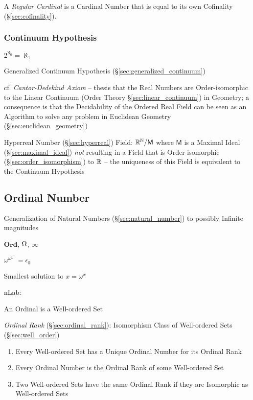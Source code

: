 A \emph{Regular Cardinal} is a Cardinal Number that is equal to its
own Cofinality (\S\ref{sec:cofinality}).



\subsubsection{Continuum Hypothesis}\label{sec:continuum_hypothesis}

$2^{\aleph_0} = \aleph_1$

Generalized Continuum Hypothesis (\S\ref{sec:generalized_continuum})

cf. \emph{Cantor-Dedekind Axiom} -- thesis that the Real Numbers are
Order-isomorphic to the Linear Continuum (Order Theory
\S\ref{sec:linear_continuum}) in Geometry; a consequence is that the
Decidability of the Ordered Real Field can be seen as an Algorithm to solve any
problem in Euclidean Geometry (\S\ref{sec:euclidean_geometry})

Hyperreal Number (\S\ref{sec:hyperreal}) Field: $\mathbb{R}^{\mathbb{N}} /
\mathsf{M}$ where $\mathsf{M}$ is a Maximal Ideal
(\S\ref{sec:maximal_ideal}) \emph{not} resulting in a Field that is
Order-isomorphic (\S\ref{sec:order_isomorphism}) to $\mathbb{R}$ -- the
uniqueness of this Field is equivalent to the Continuum Hypothesis



\subsection{Ordinal Number}\label{sec:ordinal_number}

Generalization of Natural Numbers (\S\ref{sec:natural_number}) to
possibly Infinite magnitudes %

$\mathbf{Ord}$, $\Omega$, $\infty$

$\omega^{\omega^{\omega^{\cdots}}} = \epsilon_0$

Smallest solution to $x = \omega^x$

nLab:

An Ordinal is a Well-ordered Set

\emph{Ordinal Rank} (\S\ref{sec:ordinal_rank}): Isomorphism Class of
Well-ordered Sets (\S\ref{sec:well_order})

\begin{enumerate}
  \item Every Well-ordered Set has a Unique Ordinal Number for its
    Ordinal Rank
  \item Every Ordinal Number is the Ordinal Rank of some Well-ordered
    Set
  \item Two Well-ordered Sets have the same Ordinal Rank if they are
    Isomorphic as Well-ordered Sets
\end{enumerate}

